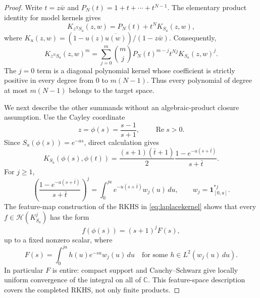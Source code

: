 \documentclass[11pt]{article}
\newcommand{\C}{\mathbb C}
\newcommand{\Hh}{\mathcal H}
\begin{document}
\begin{proof}
Write $t=z\bar w$ and $P_N(t)=1+t+\cdots+t^{N-1}$.  The elementary product
identity for model kernels gives
\begin{equation}\label{eq:split}
 K_{z^NS_a}(z,w)=P_N(t)+t^N K_{S_a}(z,w),
\end{equation}
where $K_u(z,w)=(1-u(z)\overline{u(w)})/(1-z\bar w)$.  Consequently,
\begin{equation}\label{eq:powerexpand}
 K_{z^NS_a}(z,w)^m
 =\sum_{j=0}^m\binom mj P_N(t)^{m-j}t^{Nj}K_{S_a}(z,w)^j.
\end{equation}
The $j=0$ term is a diagonal polynomial kernel whose coefficient is strictly
positive in every degree from $0$ to $m(N-1)$.  Thus every polynomial of
degree at most $m(N-1)$ belongs to the target space.

We next describe the other summands without an algebraic-product closure
assumption.  Use the Cayley coordinate
\[
 z=\phi(s)=\frac{s-1}{s+1},\qquad \operatorname{Re}s>0.
\]
Since $S_a(\phi(s))=e^{-as}$, direct calculation gives
\begin{equation}\label{eq:halfkernel}
 K_{S_a}(\phi(s),\phi(t))
 =\frac{(s+1)(\bar t+1)}2
   \frac{1-e^{-a(s+\bar t)}}{s+\bar t}.
\end{equation}
For $j\geq1$,
\begin{equation}\label{eq:laplacekernel}
 \left(\frac{1-e^{-a(s+\bar t)}}{s+\bar t}\right)^j
 =\int_0^{ja}e^{-u(s+\bar t)}w_j(u)\,du,
 \qquad w_j=\mathbf1_{[0,a]}^{*j}.
\end{equation}
The feature-map construction of the RKHS in \eqref{eq:laplacekernel} shows
that every $f\in\Hh(K_{S_a}^j)$ has the form
\begin{equation}\label{eq:featureform}
 f(\phi(s))=(s+1)^jF(s),
\end{equation}
up to a fixed nonzero scalar, where
\[
 F(s)=\int_0^{ja}h(u)e^{-su}w_j(u)\,du
 \quad\text{for some }h\in L^2(w_j(u)\,du).
\]
In particular $F$ is entire: compact support and Cauchy--Schwarz give locally
uniform convergence of the integral on all of $\C$.  This feature-space
description covers the completed RKHS, not only finite products.


\end{proof}
\end{document}
